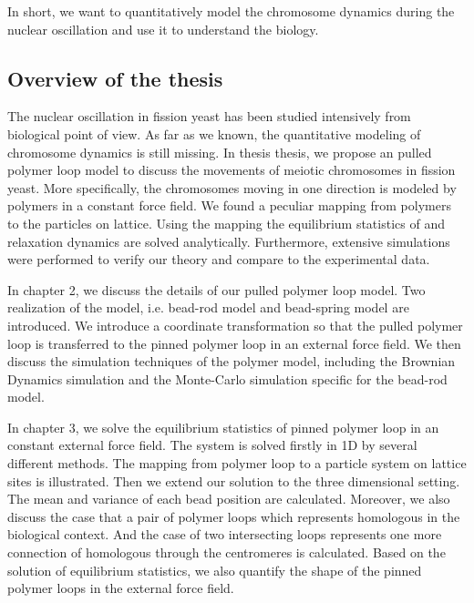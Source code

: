 In short, we want to quantitatively model the chromosome dynamics during the nuclear oscillation and use it to understand the biology. 

\subsection{Overview of the thesis}
\label{sub:overview_of_the_thesis}

The nuclear oscillation in fission yeast has been studied intensively from biological point of view. As far as we known, the quantitative modeling of chromosome dynamics is still missing. In thesis thesis, we propose an pulled polymer loop model to discuss the movements of meiotic chromosomes in fission yeast. More specifically, the chromosomes moving in one direction is modeled by polymers in a constant force field. We found a peculiar mapping from polymers to the particles on lattice. Using the mapping the equilibrium statistics of and relaxation dynamics are solved analytically. Furthermore, extensive simulations were performed to verify our theory and compare to the experimental data.

In chapter 2, we discuss the details of our pulled polymer loop model. Two realization of the model, i.e. bead-rod model and bead-spring model are introduced. We introduce a coordinate transformation so that the pulled polymer loop is transferred to the pinned polymer loop in an external force field. We then discuss the simulation techniques of the polymer model, including the Brownian Dynamics simulation and the Monte-Carlo simulation specific for the bead-rod model. 

In chapter 3, we solve the equilibrium statistics of pinned polymer loop in an constant external force field. The system is solved firstly in 1D by several different methods. The mapping from polymer loop to a particle system on lattice sites is illustrated. Then we extend our solution to the three dimensional setting. The mean and variance of each bead position are calculated. Moreover, we also discuss the case that a pair of polymer loops which represents homologous in the biological context. And the case of two intersecting loops represents one more connection of homologous through the centromeres is calculated. Based on the solution of equilibrium statistics, we also quantify the shape of the pinned polymer loops in the external force field. 

